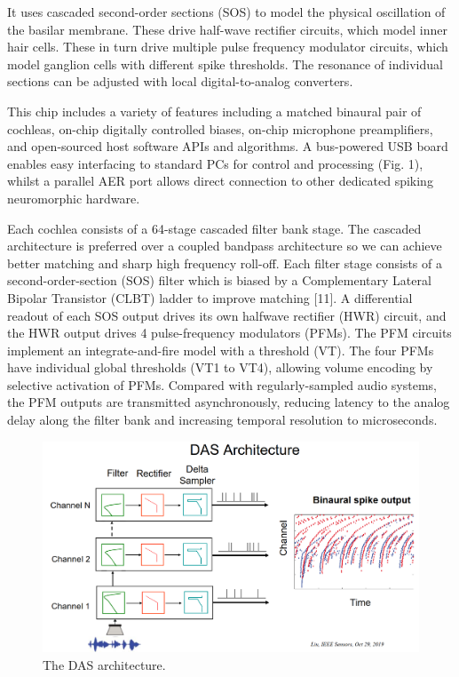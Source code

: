 \documentclass[main]{subfiles}
\begin{document}
It uses cascaded second-order sections (SOS) to model the physical oscillation of the basilar membrane. These drive half-wave rectifier circuits, which model inner hair cells. These in turn drive multiple pulse frequency modulator circuits, which model ganglion cells with different spike thresholds. The resonance of individual sections can be adjusted with local digital-to-analog converters. 

This chip includes a variety of features including a matched binaural pair of cochleas, on-chip digitally controlled biases, on-chip microphone preamplifiers, and open-sourced host software APIs and algorithms. A bus-powered USB board enables easy interfacing to standard PCs for control and processing (Fig. 1), whilst a parallel AER port allows direct connection to other dedicated spiking neuromorphic hardware.

Each cochlea consists of a 64-stage cascaded filter bank stage. The cascaded architecture is preferred over a coupled bandpass architecture so we can achieve better matching and sharp high frequency roll-off. Each filter stage consists of a second-order-section (SOS) filter which is biased by a Complementary Lateral Bipolar Transistor (CLBT) ladder to improve matching [11]. A differential readout of each SOS output drives its own halfwave rectifier (HWR) circuit, and the HWR output drives 4 pulse-frequency modulators (PFMs). The PFM circuits implement an integrate-and-fire model with a threshold (VT). The four PFMs have individual global thresholds (VT1 to VT4), allowing volume encoding by selective activation of PFMs. Compared with regularly-sampled audio systems, the PFM outputs are transmitted asynchronously, reducing latency to the analog delay along the filter bank and increasing temporal resolution to microseconds.

%
\begin{figure}[h]
    \centering
    \includegraphics[width=0.8\linewidth]{11_NeuromorphicSystems1/figures/DAS.PNG}
    \caption{The DAS architecture.}
    \label{fig:dvs}
\end{figure}
%
\end{document}
